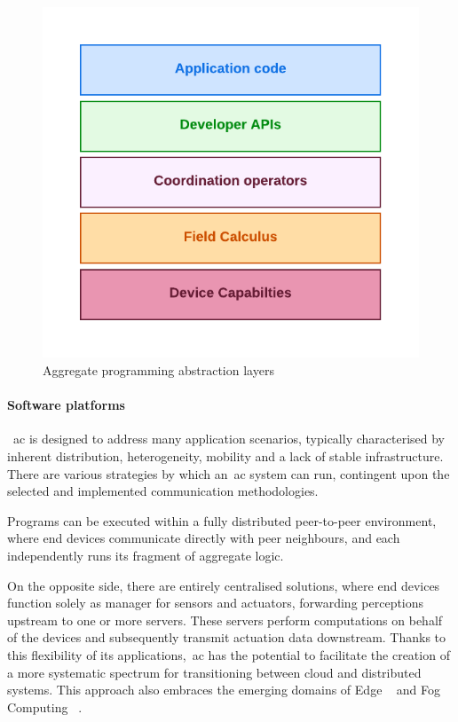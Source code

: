 \begin{figure}
    \centering
    \includegraphics[width=.5\linewidth]{figures/AC-layers}
    \caption{Aggregate programming abstraction layers}
    \label{fig:ac-layers}
\end{figure}

\paragraph{Software platforms}
~\ac{ac} is designed to address many application scenarios, typically characterised by inherent distribution, heterogeneity,
mobility and a lack of stable infrastructure.
There are various strategies by which an~\ac{ac} system can run, contingent upon the selected and implemented
communication methodologies.

Programs can be executed within a fully distributed peer-to-peer environment, where end devices communicate directly
with peer neighbours, and each independently runs its fragment of aggregate logic.

On the opposite side, there are entirely centralised solutions, where end devices function solely as manager for sensors
and actuators, forwarding perceptions upstream to one or more servers.
These servers perform computations on behalf of the devices and subsequently transmit actuation data downstream.
Thanks to this flexibility of its applications,~\ac{ac} has the potential to facilitate the creation of a more systematic
spectrum for transitioning between cloud and distributed systems.
This approach also embraces the emerging domains of Edge ~\cite{8795355} and Fog Computing ~\cite{bdcc2020010}.

